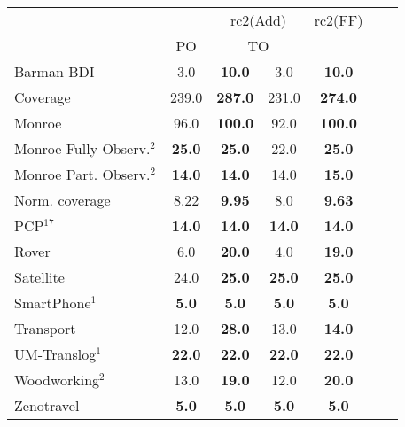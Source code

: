\begin{tabular}{lccccccl} 
\toprule 
  && \multicolumn{2}{c}{rc2(Add)} & \multicolumn{2}{c}{rc2(FF)} \\ 
\cmidrule(lr){3-4} \cmidrule(lr){5-6}  
 &PO &\multicolumn{2}{c}{ TO  } \\ 
\midrule 
Barman-BDI & 3.0 & \textbf{10.0} & 3.0 &\multicolumn{2}{c}{ \textbf{10.0}  } \\ 
\midrule 
 Coverage & 239.0 & \textbf{287.0} & 231.0 &\multicolumn{2}{c}{ \textbf{274.0}  } \\ 
\midrule 
 Monroe & 96.0 & \textbf{100.0} & 92.0 &\multicolumn{2}{c}{ \textbf{100.0}  } \\ 
Monroe Fully Observ.$^{2}$ & \textbf{25.0} & \textbf{25.0} & 22.0 &\multicolumn{2}{c}{ \textbf{25.0}  } \\ 
Monroe Part. Observ.$^{2}$ & \textbf{14.0} & \textbf{14.0} & 14.0 &\multicolumn{2}{c}{ \textbf{15.0}  } \\ 
Norm. coverage & 8.22 & \textbf{9.95} & 8.0 &\multicolumn{2}{c}{ \textbf{9.63}  } \\ 
PCP$^{17}$ & \textbf{14.0} & \textbf{14.0} & \textbf{14.0} &\multicolumn{2}{c}{ \textbf{14.0}  } \\ 
Rover & 6.0 & \textbf{20.0} & 4.0 &\multicolumn{2}{c}{ \textbf{19.0}  } \\ 
Satellite & 24.0 & \textbf{25.0} & \textbf{25.0} &\multicolumn{2}{c}{ \textbf{25.0}  } \\ 
SmartPhone$^{1}$ & \textbf{5.0} & \textbf{5.0} & \textbf{5.0} &\multicolumn{2}{c}{ \textbf{5.0}  } \\ 
Transport & 12.0 & \textbf{28.0} & 13.0 &\multicolumn{2}{c}{ \textbf{14.0}  } \\ 
UM-Translog$^{1}$ & \textbf{22.0} & \textbf{22.0} & \textbf{22.0} &\multicolumn{2}{c}{ \textbf{22.0}  } \\ 
Woodworking$^{2}$ & 13.0 & \textbf{19.0} & 12.0 &\multicolumn{2}{c}{ \textbf{20.0}  } \\ 
Zenotravel & \textbf{5.0} & \textbf{5.0} & \textbf{5.0} &\multicolumn{2}{c}{ \textbf{5.0}  } \\ 
\bottomrule 
 \end{tabular} 
